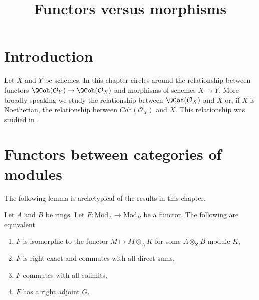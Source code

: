 

%


\title{Functors versus morphisms}


\maketitle

\label{section-phantom}

\tableofcontents

\section{Introduction}
\label{section-introduction}

\noindent
Let $X$ and $Y$ be schemes. In this chapter circles around the relationship
between functors $\QCoh(\mathcal{O}_Y) \to \QCoh(\mathcal{O}_X)$ and
morphisms of schemes $X \to Y$. More broadly speaking we study the
relationship between $\QCoh(\mathcal{O}_X)$ and $X$ or, if $X$ is Noetherian,
the relationship between $\textit{Coh}(\mathcal{O}_X)$ and $X$.
This relationship was studied in \cite{Gabriel}.







\section{Functors between categories of modules}
\label{section-functors}

\noindent
The following lemma is archetypical of the results in this chapter.

\begin{lemma}
\label{lemma-functor}
Let $A$ and $B$ be rings. Let $F : \text{Mod}_A \to \text{Mod}_B$
be a functor. The following are equivalent
\begin{enumerate}
\item $F$ is isomorphic to the functor $M \mapsto M \otimes_A K$
for some $A \otimes_\mathbf{Z} B$-module $K$,
\item $F$ is right exact and commutes with all direct sums,
\item $F$ commutes with all colimits,
\item $F$ has a right adjoint $G$.
\end{enumerate}
\end{lemma}

